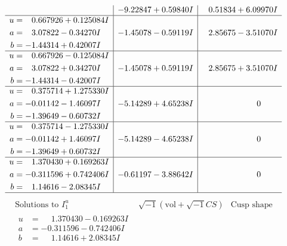 \documentclass[1p]{elsarticle_modified}
\theoremstyle{definition}
\newcommand{\I}{\sqrt{-1}}
\begin{document}
$$\begin{array}{c|c|c}
 & -9.22847 + 0.59840 I & \phantom{-}0.51834 + 6.09970 I \\ \hline\begin{aligned}
u &= \phantom{-}0.667926 + 0.125084 I \\
a &= \phantom{-}3.07822 - 0.34270 I \\
b &= -1.44314 + 0.42007 I\end{aligned}
 & -1.45078 - 0.59119 I & \phantom{-}2.85675 - 3.51070 I \\ \hline\begin{aligned}
u &= \phantom{-}0.667926 - 0.125084 I \\
a &= \phantom{-}3.07822 + 0.34270 I \\
b &= -1.44314 - 0.42007 I\end{aligned}
 & -1.45078 + 0.59119 I & \phantom{-}2.85675 + 3.51070 I \\ \hline\begin{aligned}
u &= \phantom{-}0.375714 + 1.275330 I \\
a &= -0.01142 - 1.46097 I \\
b &= -1.39649 - 0.60732 I\end{aligned}
 & -5.14289 + 4.65238 I & \phantom{-0.000000 } 0 \\ \hline\begin{aligned}
u &= \phantom{-}0.375714 - 1.275330 I \\
a &= -0.01142 + 1.46097 I \\
b &= -1.39649 + 0.60732 I\end{aligned}
 & -5.14289 - 4.65238 I & \phantom{-0.000000 } 0 \\ \hline\begin{aligned}
u &= \phantom{-}1.370430 + 0.169263 I \\
a &= -0.311596 + 0.742406 I \\
b &= \phantom{-}1.14616 - 2.08345 I\end{aligned}
 & -0.61197 - 3.88642 I & \phantom{-0.000000 } 0\\
 \hline 
 \end{array}$$\newpage$$\begin{array}{c|c|c}  
\text{Solutions to }I^u_{1}& \I (\text{vol} + \sqrt{-1}CS) & \text{Cusp shape}\\
 \hline 
\begin{aligned}
u &= \phantom{-}1.370430 - 0.169263 I \\
a &= -0.311596 - 0.742406 I \\
b &= \phantom{-}1.14616 + 2.08345 I\end{aligned}

\end{array}$$
\end{document}
